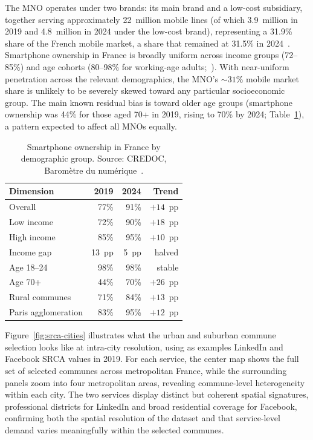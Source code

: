 \documentclass[9pt,sigconf,letterpaper]{acmart}
\begin{document}
The \ac{MNO} operates under two brands: its main brand and a low-cost subsidiary, together serving approximately 22~million mobile lines (of which 3.9~million in 2019 and 4.8~million in 2024 under the low-cost brand), representing a 31.9\% share of the French mobile market, a share that remained at 31.5\% in 2024~\cite{orange2019,orange2024, orange_databook_q2_2024}.
Smartphone ownership in France is broadly uniform across income groups (72--85\%) and age cohorts (80--98\% for working-age adults;~\cite{credoc2019barometre,credoc2024barometre}).
With near-uniform penetration across the relevant demographics, the \ac{MNO}'s ${\sim}31\%$ mobile market share is unlikely to be severely skewed toward any particular socioeconomic group.
The main known residual bias is toward older age groups (smartphone ownership was 44\% for those aged 70+ in 2019, rising to 70\% by 2024; Table~\ref{tab:credoc}), a pattern expected to affect all \acp{MNO} equally.

\begin{table}[tb]
\centering
{}
\caption{Smartphone ownership in France by demographic group. Source: CREDOC, Barom\`{e}tre du num\'{e}rique~\cite{credoc2019barometre,credoc2024barometre}.}
\begin{tabular}{lrrr}
\toprule
\textbf{Dimension} & \textbf{2019} & \textbf{2024} & \textbf{Trend} \\
\midrule
Overall             & 77\% & 91\% & $+14$~pp \\
Low income          & 72\% & 90\% & $+18$~pp \\
High income         & 85\% & 95\% & $+10$~pp \\
Income gap          & 13~pp & 5~pp & halved \\
Age 18--24          & 98\% & 98\% & stable \\
Age 70+             & 44\% & 70\% & $+26$~pp \\
Rural communes      & 71\% & 84\% & $+13$~pp \\
Paris agglomeration & 83\% & 95\% & $+12$~pp \\
\bottomrule
\end{tabular}
\label{tab:credoc}
\end{table}


Figure~\ref{fig:srca-cities} illustrates what the urban and suburban commune selection looks like at intra-city resolution, using as examples LinkedIn and Facebook \ac{SRCA} values in 2019. For each service, the center map shows the full set of selected communes across metropolitan France, while the surrounding panels zoom into four metropolitan areas, revealing commune-level heterogeneity within each city. 
The two services display distinct but coherent spatial signatures, professional districts for LinkedIn and broad residential coverage for Facebook, confirming both the spatial resolution of the dataset and that service-level demand varies meaningfully within the selected communes.
\end{document}
